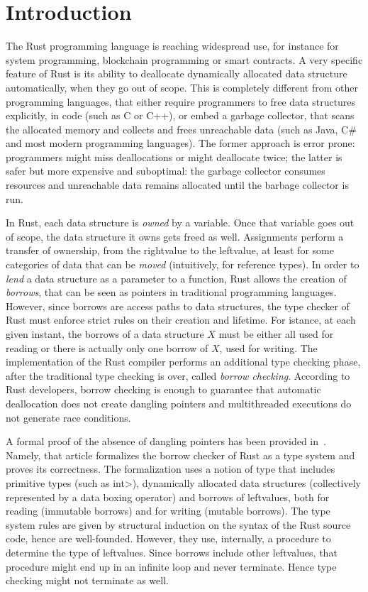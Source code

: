 \section{Introduction}\label{sec:introduction}

The Rust programming language is reaching widespread use,
for instance for system programming,
blockchain programming or smart contracts.
A very specific feature of Rust is its ability to deallocate dynamically allocated
data structure automatically, when they go out of scope. This is completely different
from other programming languages, that either require programmers to free data structures
explicitly, in code (such as C or C++), or embed a garbage collector, that scans the allocated memory
and collects and frees unreachable data (such as Java, C\# and most modern programming languages).
The former approach is error prone: programmers might miss deallocations or might deallocate twice;
the latter is safer but more expensive and suboptimal:
the garbage collector consumes resources and unreachable data remains
allocated until the barbage collector is run.

In Rust, each data structure is \emph{owned} by a variable. Once that variable goes
out of scope, the data structure it owns gets freed as well. Assignments perform
a transfer of ownership, from the rightvalue to the leftvalue, at least for some
categories of data that can be \emph{moved} (intuitively, for reference types).
In order to \emph{lend} a data structure as a parameter to a function, Rust allows the
creation of \emph{borrows}, that can be seen as pointers in traditional programming languages.
However, since borrows are access paths to data structures, the type checker of Rust
must enforce strict rules on their creation and lifetime. For istance, at each given
instant, the borrows of a data structure $X$ must be either all used for reading
or there is actually only one borrow of $X$, used for writing.
The implementation of the Rust compiler performs an additional type checking phase,
after the traditional type checking is over,
called \emph{borrow checking}.
According to Rust developers, borrow checking is enough to guarantee that
automatic deallocation does not create dangling pointers and multithreaded
executions do not generate race conditions.

A formal proof of the absence of dangling pointers has been provided in~\cite{Pearce21}.
Namely, that article formalizes the borrow checker of Rust as a type system
and proves its correctness. The formalization uses a notion of type that includes
primitive types (such as \<int>), dynamically allocated data structures
(collectively represented by a data boxing operator) and borrows of leftvalues,
both for reading (immutable borrows)
and for writing (mutable borrows). The type system rules are given by structural induction
on the syntax of the Rust source code, hence are well-founded. However, they use, internally,
a procedure to determine the type of leftvalues. Since borrows include other leftvalues,
that procedure might end up in an infinite loop and never terminate. Hence type checking
might not terminate as well.

